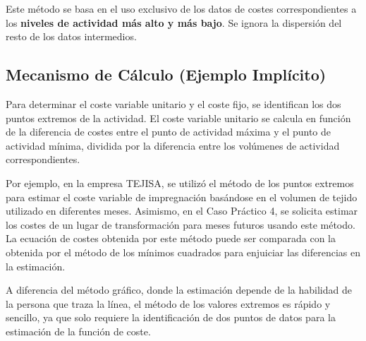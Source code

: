 Este método se basa en el uso exclusivo de los datos de costes correspondientes a los \textbf{niveles de actividad más alto y más bajo}. Se ignora la dispersión del resto de los datos intermedios.

\subsection{Mecanismo de Cálculo (Ejemplo Implícito)}

Para determinar el coste variable unitario y el coste fijo, se identifican los dos puntos extremos de la actividad. El coste variable unitario se calcula en función de la diferencia de costes entre el punto de actividad máxima y el punto de actividad mínima, dividida por la diferencia entre los volúmenes de actividad correspondientes.

Por ejemplo, en la empresa TEJISA, se utilizó el método de los puntos extremos para estimar el coste variable de impregnación basándose en el volumen de tejido utilizado en diferentes meses. Asimismo, en el Caso Práctico 4, se solicita estimar los costes de un lugar de transformación para meses futuros usando este método. La ecuación de costes obtenida por este método puede ser comparada con la obtenida por el método de los mínimos cuadrados para enjuiciar las diferencias en la estimación.

\begin{tcolorbox}[title=\textbf{Nota Aclaratoria}]
A diferencia del método gráfico, donde la estimación depende de la habilidad de la persona que traza la línea, el método de los valores extremos es rápido y sencillo, ya que solo requiere la identificación de dos puntos de datos para la estimación de la función de coste.
\end{tcolorbox}

